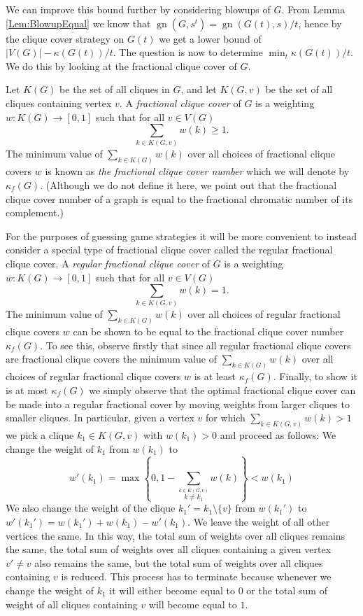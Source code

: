 \documentclass[a4paper, 14pt]{extarticle}
\theoremstyle{plain}
\DeclareMathOperator{\gn}{gn}
\begin{document}
We can improve this bound further by considering blowups of
$G$. From Lemma \ref{Lem:BlowupEqual} we know that $\gn(G,s^t) =
\gn(G(t),s)/t$, hence by the clique cover strategy on $G(t)$ we get
a lower bound of $|V(G)|-\kappa(G(t))/t$. The question is now to
determine $\min_t\kappa(G(t))/t$. We do this by looking at the fractional clique cover of $G$.

Let $K(G)$ be the set of all cliques in $G$, and let $K(G,v)$ be the
set of all cliques containing vertex $v$. A \emph{fractional
clique cover} of $G$ is a weighting $w:K(G)\to [0,1]$ such that for
all $v\in V(G)$
\[
\sum_{k\in K(G,v)} w(k) \geq 1.
\]
The minimum value of $\sum_{k\in K(G)}w(k)$ over all choices of fractional clique covers $w$ is known as \emph{the
fractional clique cover number} which we will denote by
$\kappa_f(G)$. (Although we do not define it here, we point out that the fractional clique cover number of a graph
is equal to the fractional chromatic number of its complement.)

For the purposes of guessing game strategies it will be more convenient to instead consider a special type of fractional clique cover called the regular fractional clique cover. A \emph{regular fractional clique cover} of $G$ is a weighting $w:K(G)\to [0,1]$ such that for
all $v\in V(G)$
\[
\sum_{k\in K(G,v)} w(k) = 1.
\]
The minimum value of $\sum_{k\in K(G)}w(k)$ over all choices of regular fractional clique covers $w$ can be shown to be equal to the fractional clique cover number  $\kappa_f(G)$. To see this, observe firstly that since all regular fractional clique covers are fractional clique covers the minimum value of $\sum_{k\in K(G)}w(k)$ over all choices of regular fractional clique covers $w$ is at least $\kappa_f(G)$. Finally, to show it is at most $\kappa_f(G)$ we simply observe that the optimal fractional clique cover can be made into a regular fractional cover by moving weights from larger cliques to smaller cliques. In particular, given a vertex $v$ for which $\sum_{k\in K(G,v)} w(k) > 1$ we pick a clique $k_1 \in K(G,v)$ with $w(k_1) > 0$ and proceed as follows: We change the weight of $k_1$ from $w(k_1)$ to 
\[w'(k_1) = \max\left\{0,1- \sum_{\stackrel{k\in K(G,v)}{k \neq k_1}} w(k)\right\} < w(k_1)\]
We also change the weight of the clique $k_1' = k_1 \setminus \{v\}$ from $w(k_1')$ to $w'(k_1') = w(k_1') + w(k_1) - w'(k_1)$. We leave the weight of all other vertices the same. In this way, the total sum of weights over all cliques remains the same, the total sum of weights over all cliques containing a given vertex $v' \neq v$ also remains the same, but the total sum of weights over all cliques containing $v$ is reduced. This process has to terminate because whenever we change the weight of $k_1$ it will either become equal to $0$ or the total sum of weight of all cliques containing $v$ will become equal to $1$. 
\end{document}
